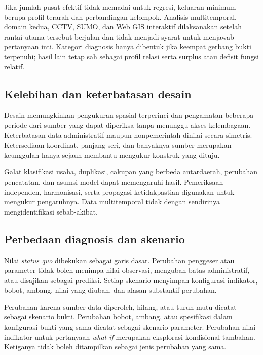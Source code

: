 \documentclass[11pt,a4paper,oneside,openany,indonesian]{report}
\begin{document}
Jika jumlah pusat efektif tidak memadai untuk regresi, keluaran minimum
berupa profil terarah dan perbandingan kelompok. Analisis multitemporal,
domain kedua, CCTV, SUMO, dan Web GIS interaktif dilaksanakan setelah
rantai utama tersebut berjalan dan tidak menjadi syarat untuk menjawab
pertanyaan inti. Kategori diagnosis hanya dibentuk jika keempat gerbang
bukti terpenuhi; hasil lain tetap sah sebagai profil relasi serta surplus
atau defisit fungsi relatif.

\subsection{Kelebihan dan keterbatasan
desain}\label{kelebihan-dan-keterbatasan-desain}

Desain memungkinkan pengukuran spasial terperinci dan pengamatan
beberapa periode dari sumber yang dapat diperiksa tanpa menunggu akses
kelembagaan. Keterbatasan data administratif maupun nonpemerintah
dinilai secara simetris. Ketersediaan koordinat, panjang seri, dan
banyaknya sumber merupakan keunggulan hanya sejauh membantu mengukur
konstruk yang dituju.

Galat klasifikasi usaha, duplikasi, cakupan yang berbeda antardaerah,
perubahan pencatatan, dan asumsi model dapat memengaruhi hasil.
Pemeriksaan independen, harmonisasi, serta propagasi ketidakpastian
digunakan untuk mengukur pengaruhnya. Data multitemporal tidak dengan
sendirinya mengidentifikasi sebab-akibat.

\subsection{Perbedaan diagnosis dan
skenario}\label{perbedaan-diagnosis-dan-skenario}

Nilai \emph{status quo} dibekukan sebagai garis dasar. Perubahan
penggeser atau parameter tidak boleh menimpa nilai observasi, mengubah
batas administratif, atau disajikan sebagai prediksi. Setiap skenario
menyimpan konfigurasi indikator, bobot, ambang, nilai yang diubah, dan
alasan substantif perubahan.

Perubahan karena sumber data diperoleh, hilang, atau turun mutu dicatat
sebagai skenario bukti. Perubahan bobot, ambang, atau
spesifikasi dalam konfigurasi bukti yang sama dicatat sebagai
skenario parameter. Perubahan nilai indikator untuk pertanyaan
\emph{what-if} merupakan eksplorasi kondisional tambahan. Ketiganya
tidak boleh ditampilkan sebagai jenis perubahan yang sama.
\end{document}
